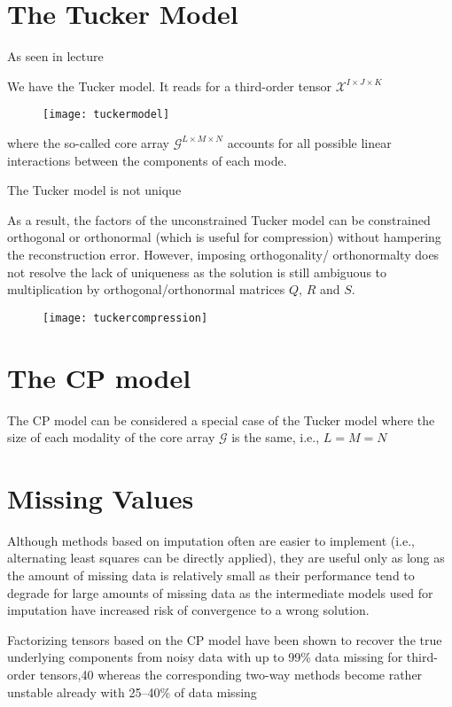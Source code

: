 \section{The Tucker Model}

As seen in lecture \cite[p.~17]{lecture11}

We have the Tucker model. It reads for a third-order tensor $\mathcal{X}^{I \times J \times K}$

\begin{figure}[H]
  \centering
  \texttt{[image: tuckermodel]}
\end{figure}

where the so-called core array $\mathcal{G}^{L \times M \times N}$ accounts for all possible linear interactions between the components of each mode.

The Tucker model is not unique

As a result, the factors of the unconstrained Tucker
model can be constrained orthogonal or orthonormal
(which is useful for compression) without hampering
the reconstruction error. However, imposing orthogonality/
orthonormalty does not resolve the lack
of uniqueness as the solution is still ambiguous to
multiplication by orthogonal/orthonormal matrices $Q$, $R$ and $S$. 

\begin{figure}[H]
  \centering
  \texttt{[image: tuckercompression]}
\end{figure}

\section{The CP model}

The CP model can be considered a special case of the Tucker
model where the size of each modality of the core
array $\mathcal{G}$ is the same, i.e., $L = M = N$

\section{Missing Values}

Although methods based on imputation
often are easier to implement (i.e., alternating
least squares can be directly applied), they are
useful only as long as the amount of missing data
is relatively small as their performance tend to degrade
for large amounts of missing data as the intermediate
models used for imputation have increased
risk of convergence to a wrong solution.

Factorizing tensors
based on the CP model have been shown to
recover the true underlying components from noisy
data with up to 99\% data missing for third-order
tensors,40 whereas the corresponding two-way methods
become rather unstable already with 25–40\%
of data missing

 